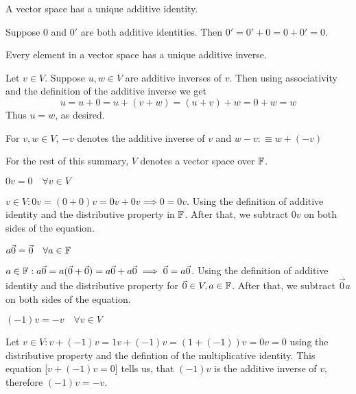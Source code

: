 \setcounter{thm}{25}
\begin{thm} 
  \label{thm: unique additive identity}
  A vector space has a unique additive identity.
\end{thm}
\begin{prf}
  Suppose $0$ and $0'$ are both additive identities. Then $0' = 0'+ 0 = 0 + 0' = 0.$
\end{prf}

\begin{thm} 
  Every element in a vector space has a unique additive inverse.
\end{thm}
\begin{prf}
  Let $v\in V.$ Suppose $u,w \in V$ are additive inverses of $v$. Then using associativity and the definition of the additive inverse we get
  \begin{equation}
    u = u + 0 = u + (v + w) = (u+v) + w = 0 + w =w
  \end{equation}
  Thus $u = w$, as desired.
\end{prf}

\begin{mydef}
  For $v,w\in V$, $-v$ denotes the additive inverse of $v$ and $w-v:\equiv w+(-v)$
\end{mydef}

\begin{mydef}
  For the rest of this summary, $V$ denotes a vector space over $\mathbb{F}$.
\end{mydef}

\begin{thm} 
  $0v = 0 \quad \forall v\in V$
\end{thm}
\begin{prf}
  $v \in V: 0v = (0+0)v = 0v +0v \implies 0 = 0v$. Using the definition of additive identity and the distributive property in $\mathbb{F}$. After that, we subtract $0v$ on both sides of the equation.
\end{prf}

\begin{thm} 
  $a \vec0= \vec0 \quad \forall a\in \mathbb{F}$
\end{thm}
\begin{prf}
  $a \in \mathbb{F}: a\vec0 = a(\vec0+\vec0) = a\vec0 + a\vec0 \implies \vec0 = a\vec0$. Using the definition of additive identity and the distributive property for $\vec0 \in V, a \in \mathbb{F}$. After that, we subtract $\vec0a$ on both sides of the equation.
\end{prf}

\begin{thm} 
  \label{thm: minus one times a vector}
  $(-1)v = -v \quad \forall v\in V$
\end{thm}
\begin{prf}
  Let $v \in V: v + (-1)v = 1v + (-1)v = (1 + (-1))v = 0v = 0$ using the distributive property and the defintion of the multiplicative identity. This equation [$v+(-1)v=0$] tells us, that $(-1)v$ is the additive inverse of $v$, therefore $(-1)v = -v$.
\end{prf}
